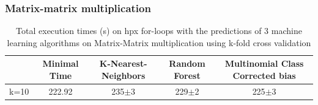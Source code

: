 \newpage
\subsubsection{Matrix-matrix multiplication}
\begin{table}[h]
	\centering
	\caption{Total execution times (s) on hpx for-loops with the predictions of 3 machine learning algorithms on Matrix-Matrix multiplication using k-fold cross validation}
	\label{my-label}
	\begin{tabular}{|c|c|c|c|c|}
		\hline
		& Minimal Time&K-Nearest-Neighbors & Random Forest &Multinomial Class Corrected bias\\ \hline
		k=10  &222.92&
		235$\pm$3       & 229$\pm$2&225$\pm$3 \\ \hline
	\end{tabular}
\end{table}

